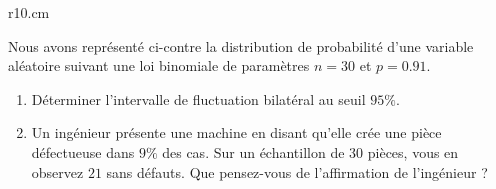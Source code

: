 
\begin{exercice}\label{exosmath-0384}

    \begin{wrapfigure}{r}{10.cm}
   \vspace{-0.5cm}        %
   \centering
   
\end{wrapfigure}

Nous avons représenté ci-contre la distribution de probabilité d'une variable aléatoire suivant une loi binomiale de paramètres \( n=30\) et \( p=0.91\). 
\begin{enumerate}
    \item
Déterminer l'intervalle de fluctuation bilatéral au seuil \( 95\%\).
        \item
            Un ingénieur présente une machine en disant qu'elle crée une pièce défectueuse dans \( 9\%\) des cas. Sur un échantillon de \( 30\) pièces, vous en observez \( 21\) sans défauts. Que pensez-vous de l'affirmation de l'ingénieur ?
\end{enumerate}


\end{exercice}
